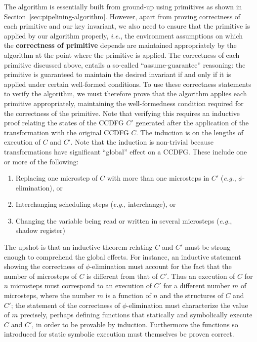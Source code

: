 The algorithm is essentially built from ground-up using primitives
as shown in Section~\ref{sec:pipelining-algorithm}. 
However, apart from proving correctness of each primitive and our key invariant,
we also need to ensure that the primitive is applied by our
algorithm properly, {\em i.e.}, the environment
assumptions on which the {\bf correctness of primitive}
depends are maintained appropriately by the algorithm at
the point where the primitive is applied. 
The correctness of each primitive discussed above, entails a
so-called ``assume-guarantee'' reasoning: the primitive is
guaranteed to maintain the desired invariant if and only if
it is applied under certain well-formed conditions.  To use
these correctness statements to verify the algorithm, we
must therefore prove that the algorithm applies each
primitive appropriately, maintaining the well-formedness
condition required for the correctness of the primitive.
Note that verifying this requires an inductive proof
relating the states of the CCDFG $C'$ generated after the
application of the transformation with the original CCDFG
$C$.  The induction is on the lengths of execution of $C$
and $C'$.  Note that the induction is non-trivial because
transformations have significant ``global'' effect on a
CCDFG.  These include one or more of the following:

\begin{enumerate}
\item Replacing one microstep of $C$ with more than one
  microsteps in $C'$ ({\em e.g.}, $\phi$-elimination), or
\item Interchanging scheduling steps ({\em e.g.},
  interchange), or
\item Changing the variable being read or written in several
  microsteps ({\em e.g.}, shadow register)
\end{enumerate}
The upshot is that an inductive theorem relating $C$ and
$C'$ must be strong enough to comprehend the global effects.
For instance, an inductive statement showing the
correctness of $\phi$-elimination must account for the fact
that the number of microsteps of $C$ is different from that
of $C'$.  Thus an execution of $C$ for $n$ microsteps must
correspond to an execution of $C'$ for a different number
$m$ of microsteps, where the number $m$ is a function of $n$
and the structures of $C$ and $C'$; the statement of the
correctness of $\phi$-elimination must characterize the
value of $m$ precisely, perhaps defining functions that
statically and symbolically execute $C$ and $C'$, in order
to be provable by induction.  Furthermore the functions so
introduced for static symbolic execution must themselves be
proven correct.

